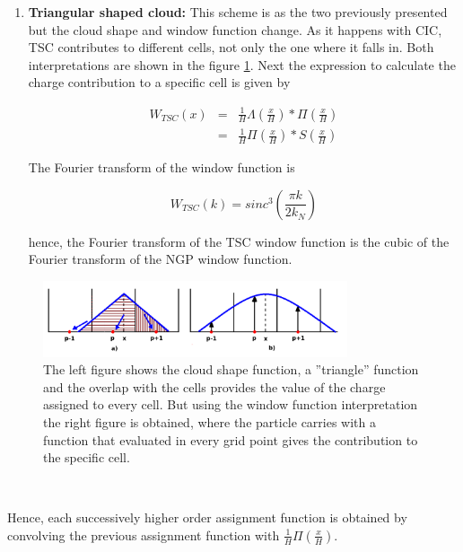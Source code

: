 \begin{enumerate}
\item \textbf{ Triangular shaped cloud: } This scheme is as the two previously presented but the cloud
shape and window function change. As it happens with CIC, TSC contributes to different
cells, not only the one where it falls in. Both interpretations are shown in the figure \ref{TSC}.
Next the expression to calculate the charge contribution to a specific cell is given by

\begin{eqnarray*}
 W_{TSC}(x)  &=& \frac{1}{H}\Lambda \left( \frac{x}{H} \right)*\Pi \left(\frac{x}{H}\right) \\ 
&  = &\frac{1}{H}\Pi\left(\frac{x}{H}\right)*S\left(\frac{x}{H}\right)
\end{eqnarray*}

The Fourier transform of the window function is 

\[ W_{TSC}(k)= sinc^3\left(\frac{\pi k}{2k_N} \right)\]

hence, the Fourier transform of the TSC window function is the cubic of the Fourier 
transform of the NGP window function. 

\end{enumerate}

\begin{figure}[htbp]
       \centering
               \includegraphics[width=0.8\textwidth]{Images/chapter3/TSC.png}
       \caption{\small The left figure shows the cloud shape function, a ''triangle'' function
       and the overlap with the cells provides the value of the charge assigned to every cell. But
       using the window function interpretation the right figure is obtained, where the particle carries
       with a function that evaluated in every grid point gives the contribution to the specific cell. }
       \label{TSC}
 \end{figure}

\

Hence, each successively higher order assignment function is obtained by convolving the previous
assignment function with $\frac{1}{H}\Pi\left(\frac{x}{H}\right)$. 

